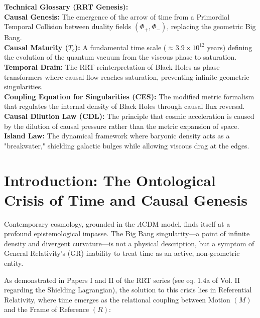 \documentclass[12pt, a4paper]{article}
\begin{document}
\begin{center}
    \noindent \textbf{Technical Glossary (RRT Genesis):} \\
    \textbf{Causal Genesis:} The emergence of the arrow of time from a Primordial Temporal Collision between duality fields $(\Phi_{+}, \Phi_{-})$, replacing the geometric Big Bang. \\
    \textbf{Causal Maturity ($T_c$):} A fundamental time scale ($\approx 3.9 \times 10^{12}$ years) defining the evolution of the quantum vacuum from the viscous phase to saturation. \\
    \textbf{Temporal Drain:} The RRT reinterpretation of Black Holes as phase transformers where causal flow reaches saturation, preventing infinite geometric singularities. \\
    \textbf{Coupling Equation for Singularities (CES):} The modified metric formalism that regulates the internal density of Black Holes through causal flux reversal. \\
    \textbf{Causal Dilution Law (CDL):} The principle that cosmic acceleration is caused by the dilution of causal pressure rather than the metric expansion of space. \\
    \textbf{Island Law:} The dynamical framework where baryonic density acts as a "breakwater," shielding galactic bulges while allowing viscous drag at the edges.
\end{center}
\vspace*{\fill}

\newpage

\section{Introduction: The Ontological Crisis of Time and Causal Genesis}

Contemporary cosmology, grounded in the \(\Lambda\)CDM model, finds itself at a profound epistemological impasse. The Big Bang singularity—a point of infinite density and divergent curvature—is not a physical description, but a symptom of General Relativity's (GR) inability to treat time as an active, non-geometric entity.

As demonstrated in Papers I and II of the RRT series (see eq. 1.4a of Vol. II regarding the Shielding Lagrangian), the solution to this crisis lies in Referential Relativity, where time emerges as the relational coupling between Motion $(M)$ and the Frame of Reference $(R)$:
\end{document}
